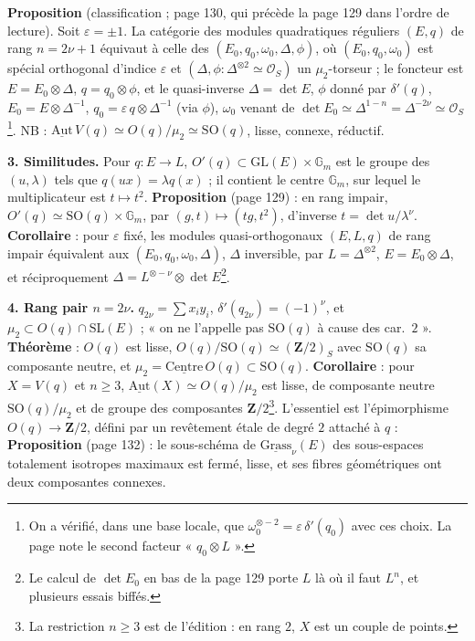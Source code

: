 \documentclass[11pt,a4paper]{article}
\begin{document}
\textbf{Proposition} (classification ; page 130, qui précède la page 129 dans
l'ordre de lecture). Soit $\varepsilon = \pm 1$. La catégorie des modules
quadratiques réguliers $(E, q)$ de rang $n = 2\nu + 1$ équivaut à celle des $(E_0,
q_0, \omega_0, \Delta, \phi)$, où $(E_0, q_0, \omega_0)$ est spécial orthogonal
d'indice $\varepsilon$ et $(\Delta, \phi : \Delta^{\otimes 2} \simeq \mathcal{O}_S)$
un $\mu_2$-torseur ; le foncteur est $E = E_0 \otimes \Delta$, $q = q_0 \otimes \phi$,
et le quasi-inverse $\Delta = \det E$, $\phi$ donné par $\delta'(q)$, $E_0 = E \otimes
\Delta^{-1}$, $q_0 = \varepsilon\,q \otimes \Delta^{-1}$ (via $\phi$), $\omega_0$ venant
de $\det E_0 \simeq \Delta^{1-n} = \Delta^{-2\nu} \simeq \mathcal{O}_S$\footnote{On a
vérifié, dans une base locale, que $\omega_0^{\otimes -2} = \varepsilon\,\delta'(q_0)$
avec ces choix. La page note le second facteur « $q_0 \otimes L$ ».}. NB :
$\underline{\mathrm{Aut}}\,V(q) \simeq O(q)/\mu_2 \simeq \mathrm{SO}(q)$, lisse, connexe,
réductif.

\textbf{3. Similitudes.} Pour $q : E \to L$, $O'(q) \subset \mathrm{GL}(E) \times
\mathbb{G}_m$ est le groupe des $(u, \lambda)$ tels que $q(ux) = \lambda q(x)$ ; il
contient le centre $\mathbb{G}_m$, sur lequel le multiplicateur est $t \mapsto t^2$.
\textbf{Proposition} (page 129) : en rang impair, $O'(q) \simeq \mathrm{SO}(q) \times
\mathbb{G}_m$, par $(g, t) \mapsto (tg, t^2)$, d'inverse $t = \det u/\lambda^\nu$.
\textbf{Corollaire} : pour $\varepsilon$ fixé, les modules quasi-orthogonaux $(E, L, q)$
de rang impair équivalent aux $(E_0, q_0, \omega_0, \Delta)$, $\Delta$ inversible, par
$L = \Delta^{\otimes 2}$, $E = E_0 \otimes \Delta$, et réciproquement $\Delta =
L^{\otimes -\nu} \otimes \det E$\footnote{Le calcul de $\det E_0$ en bas de la page 129
porte $L$ là où il faut $L^n$, et plusieurs essais biffés.}.

\textbf{4. Rang pair $n = 2\nu$.} $q_{2\nu} = \sum x_iy_i$, $\delta'(q_{2\nu}) =
(-1)^\nu$, et $\mu_2 \subset O(q) \cap \mathrm{SL}(E)$ ; « on ne l'appelle pas
$\mathrm{SO}(q)$ à cause des car.\ $2$ ». \textbf{Théorème} : $O(q)$ est lisse,
$O(q)/\mathrm{SO}(q) \simeq (\mathbf{Z}/2)_S$ avec $\mathrm{SO}(q)$ sa composante neutre, et
$\mu_2 = \underline{\mathrm{Centre}}\,O(q) \subset \mathrm{SO}(q)$. \textbf{Corollaire} :
pour $X = V(q)$ et $n \geq 3$, $\underline{\mathrm{Aut}}(X) \simeq O(q)/\mu_2$ est lisse,
de composante neutre $\mathrm{SO}(q)/\mu_2$ et de groupe des composantes
$\mathbf{Z}/2$\footnote{La restriction $n \geq 3$ est de l'édition : en rang $2$, $X$ est
un couple de points.}. L'essentiel est l'épimorphisme $O(q) \to \mathbf{Z}/2$, défini par
un revêtement étale de degré $2$ attaché à $q$ : \textbf{Proposition} (page 132) : le
sous-schéma de $\underline{\mathrm{Grass}}_\nu(E)$ des sous-espaces totalement isotropes
maximaux est fermé, lisse, et ses fibres géométriques ont deux composantes connexes.
\end{document}
